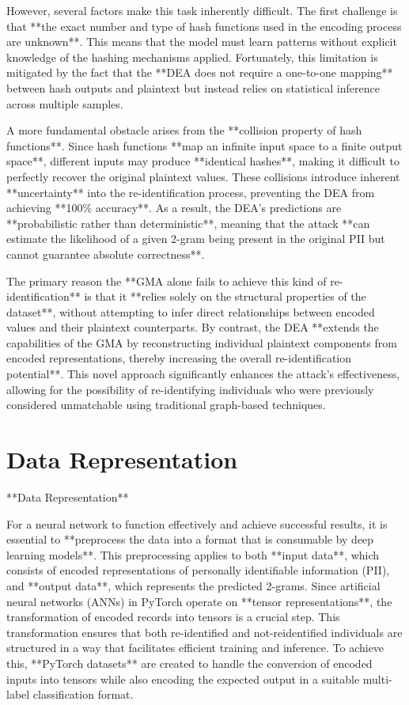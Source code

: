 However, several factors make this task inherently difficult. The first challenge is that **the exact number and type of hash functions used in the encoding process are unknown**. This means that the model must learn patterns without explicit knowledge of the hashing mechanisms applied. Fortunately, this limitation is mitigated by the fact that the **DEA does not require a one-to-one mapping** between hash outputs and plaintext but instead relies on statistical inference across multiple samples.

A more fundamental obstacle arises from the **collision property of hash functions**. Since hash functions **map an infinite input space to a finite output space**, different inputs may produce **identical hashes**, making it difficult to perfectly recover the original plaintext values. These collisions introduce inherent **uncertainty** into the re-identification process, preventing the DEA from achieving **100\% accuracy**. As a result, the DEA's predictions are **probabilistic rather than deterministic**, meaning that the attack **can estimate the likelihood of a given 2-gram being present in the original PII but cannot guarantee absolute correctness**.

The primary reason the **GMA alone fails to achieve this kind of re-identification** is that it **relies solely on the structural properties of the dataset**, without attempting to infer direct relationships between encoded values and their plaintext counterparts. By contrast, the DEA **extends the capabilities of the GMA by reconstructing individual plaintext components from encoded representations, thereby increasing the overall re-identification potential**. This novel approach significantly enhances the attack's effectiveness, allowing for the possibility of re-identifying individuals who were previously considered unmatchable using traditional graph-based techniques.

\section{Data Representation} \label{sec:representation}

 **Data Representation** \label{sec:representation}

For a neural network to function effectively and achieve successful results, it is essential to **preprocess the data into a format that is consumable by deep learning models**. This preprocessing applies to both **input data**, which consists of encoded representations of personally identifiable information (PII), and **output data**, which represents the predicted 2-grams. Since artificial neural networks (ANNs) in PyTorch operate on **tensor representations**, the transformation of encoded records into tensors is a crucial step. This transformation ensures that both re-identified and not-reidentified individuals are structured in a way that facilitates efficient training and inference. To achieve this, **PyTorch datasets** are created to handle the conversion of encoded inputs into tensors while also encoding the expected output in a suitable multi-label classification format.

